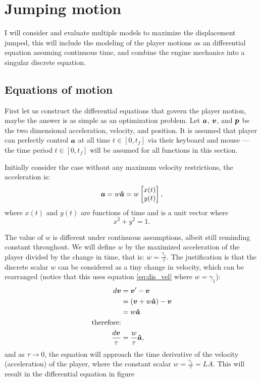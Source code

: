 \section{Jumping motion}
I will consider and evaluate multiple models to maximize the displacement jumped, this will include the modeling of the player motions as an differential equation assuming continuous time, and combine the engine mechanics into a singular discrete equation.

\subsection{Equations of motion}
First let us construct the differential equations that govern the player motion, maybe the answer is as simple as an optimization problem. Let $\boldsymbol{a}$, $\boldsymbol{v}$, and $\boldsymbol{p}$ be the two dimensional acceleration, velocity, and position. It is assumed that player can perfectly control $\boldsymbol{a}$ at all time $t \in [0, t_f]$ via their keyboard and mouse --- the time period $t\in[0,t_f]$ will be assumed for all functions in this section.

Initially consider the case without any maximum velocity restrictions, the acceleration is:
\begin{align*}
    \boldsymbol{a} = w\boldsymbol{\hat{a}} = w\begin{bmatrix}x(t)\\y(t) \end{bmatrix},
\end{align*}
where $x(t)$ and $y(t)$ are functions of time and is a unit vector where
\[
x^2 + y^2 = 1.
\]

The value of $w$ is different under continuous assumptions, albeit still reminding constant throughout. We will define $w$ by the maximized acceleration of the player divided by the change in time, that is: $w = \frac{\gamma_1}{\tau}$. The justification is that the discrete scalar $w$ can be considered as a tiny change in velocity, which can be rearranged (notice that this uses equation \ref{eq:dis_vel} where $w=\gamma_1$):
\begin{align*}
    d\boldsymbol{v} &=  \boldsymbol{v}' - \boldsymbol{v}\\
    &= (\boldsymbol{v} + w \boldsymbol{\hat{a}}) - \boldsymbol{v}\\
    &= w \boldsymbol{\hat{a}}\\
    \text{therefore:}&\\
    \frac{d\boldsymbol{v}}{\tau} &= \frac{w}{\tau} \boldsymbol{\hat{a}},
\end{align*}
and as $\tau \to 0$, the equation will approach the time derivative of the velocity (acceleration) of the player, where the constant scalar $w=\frac{\gamma_1}{\tau} = LA$. This will result in the  differential equation in figure

